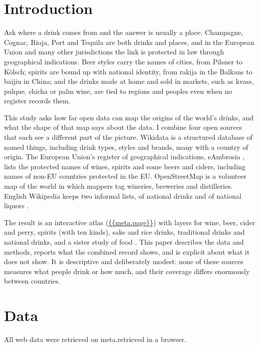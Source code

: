 \documentclass[11pt,a4paper]{article}
\begin{document}
\section{Introduction}
Ask where a drink comes from and the answer is usually a place. Champagne, Cognac, Rioja, Port and Tequila are both drinks and places, and in the European Union and many other jurisdictions the link is protected in law through geographical indications. Beer styles carry the names of cities, from Pilsner to Kölsch; spirits are bound up with national identity, from rakija in the Balkans to baijiu in China; and the drinks made at home and sold in markets, such as kvass, pulque, chicha or palm wine, are tied to regions and peoples even when no register records them.

This study asks how far open data can map the origins of the world's drinks, and what the shape of that map says about the data. I combine four open sources that each see a different part of the picture. Wikidata \citep{wikidata} is a structured database of named things, including drink types, styles and brands, many with a country of origin. The European Union's register of geographical indications, eAmbrosia \citep{eambrosia}, lists the protected names of wines, spirits and some beers and ciders, including names of non-EU countries protected in the EU. OpenStreetMap \citep{osm} is a volunteer map of the world in which mappers tag wineries, breweries and distilleries. English Wikipedia keeps two informal lists, of national drinks and of national liquors \citep{wp_national,wp_liquors}.

The result is an interactive atlas (\url{{{meta.page}}}) with layers for wine, beer, cider and perry, spirits (with ten kinds), sake and rice drinks, traditional drinks and national drinks, and a sister study of food \citep{foodmap}. This paper describes the data and methods, reports what the combined record shows, and is explicit about what it does not show. It is descriptive and deliberately modest: none of these sources measures what people drink or how much, and their coverage differs enormously between countries.

\section{Data}
All web data were retrieved on {{meta.retrieved}} in a browser.
\end{document}
